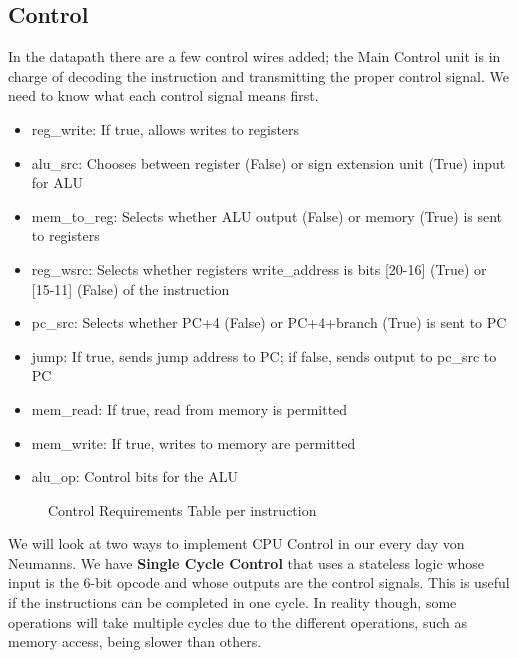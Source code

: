 \subsection{Control}
In the datapath there are a few control wires added; the Main Control unit is in charge of decoding the instruction and transmitting the proper control signal. We need to know what each control signal means first.
\begin{itemize}
	\item reg\_write: If true, allows writes to registers
	\item alu\_src: Chooses between register (False) or sign extension unit (True) input for ALU
	\item mem\_to\_reg: Selects whether ALU output (False) or memory (True) is sent to registers
	\item reg\_wsrc: Selects whether registers write\_address is bits [20-16] (True) or [15-11] (False) of the instruction
	\item pc\_src: Selects whether PC+4 (False) or PC+4+branch (True) is sent to PC
	\item jump: If true, sends jump address to PC; if false, sends output to pc\_src to PC
	\item mem\_read: If true, read from memory is permitted
	\item mem\_write: If true, writes to memory are permitted
	\item alu\_op: Control bits for the ALU
\end{itemize}
\begin{figure}[!htb]
	\caption{\label{fig:control} Control Requirements Table per instruction}
\end{figure}
We will look at two ways to implement CPU Control in our every day von Neumanns. We have \textbf{Single Cycle Control} that uses a stateless logic whose input is the 6-bit opcode and whose outputs are the control signals. This is useful if the instructions can be completed in one cycle. In reality though, some operations will take multiple cycles due to the different operations, such as memory access, being slower than others.

